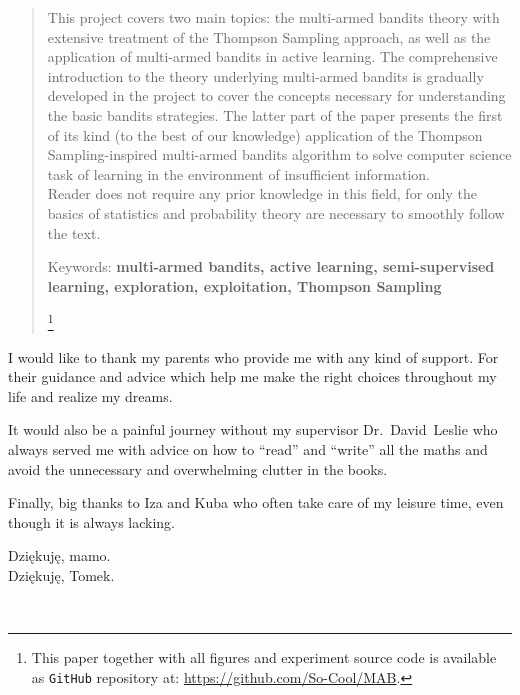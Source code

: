 \documentclass[12pt, a4paper, pdflatex, leqno, twoside]{report}
\newenvironment{dedication}
  {\clearpage           %
   \thispagestyle{empty}%
   \vspace*{\stretch{1}}%
   \itshape             %
   \raggedright          %
   \par\setlength{\leftskip}{0.3\textwidth}\noindent\ignorespaces
  }
  {\par %
   \vspace{\stretch{3}} %
   \clearpage           %
  }
\begin{document}
\begin{abstract}
\thispagestyle{empty}%
This project covers two main topics: the multi-armed bandits theory with extensive 
treatment of the Thompson Sampling approach, as well as the application of multi-armed bandits in active 
learning. The comprehensive introduction to the theory underlying multi-armed 
bandits is gradually developed in the project to cover the concepts necessary for understanding 
the basic bandits strategies. The latter part of the paper presents the first of its 
kind (to the best of our knowledge) application of the Thompson Sampling-inspired multi-armed bandits algorithm 
to solve computer science task of learning in the environment of insufficient 
information.\\
Reader does not require any prior knowledge in this field, for only the basics of 
statistics and probability theory are necessary to smoothly follow the text.\\
\begin{center}
Keywords: \textbf{multi-armed bandits, active learning, semi-supervised learning, 
exploration, exploitation, Thompson Sampling}

\let\thefootnote\relax\footnote{\noindent This paper together with all 
figures and experiment source code is available as \texttt{GitHub} repository 
at: \url{https://github.com/So-Cool/MAB}.}

\end{center}
\end{abstract}

\newpage
\thispagestyle{empty}
\mbox{}

\begin{dedication}
I would like to thank my parents who provide me with any kind of support. For 
their guidance and advice which help me make the right choices throughout 
my life and realize my dreams.\newline

It would also be a painful journey without my supervisor Dr.~David~Leslie who 
always served me with advice on how to ``read'' and ``write'' all the maths and 
avoid the unnecessary and overwhelming clutter in the books.\newline

Finally, big thanks to Iza and Kuba who often take care of my leisure time, even 
though it is always lacking.\\[2cm]


\begin{flushright}
Dzi\k{e}kuj\k{e}, mamo.\\
Dzi\k{e}kuj\k{e}, Tomek.
\end{flushright}



\textcolor{white}{found me!}



\end{dedication}
\end{document}
